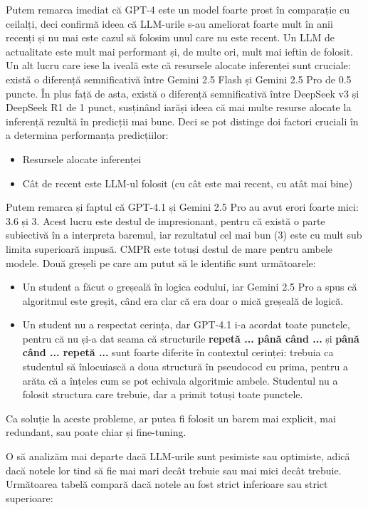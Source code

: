 \documentclass[12pt, a4paper]{report}
\begin{document}
Putem remarca imediat că GPT-4 este un model foarte prost în comparație cu ceilalți, deci confirmă ideea că LLM-urile s-au ameliorat foarte mult în anii recenți  
și nu mai este cazul să folosim unul care nu este recent. Un LLM de actualitate este mult mai performant și, de multe ori, mult mai ieftin de folosit.  
Un alt lucru care iese la iveală este că resursele alocate inferenței sunt cruciale: există o diferență semnificativă între Gemini 2.5 Flash și Gemini 2.5 Pro de 0.5 puncte.  
În plus față de asta, există o diferență semnificativă între DeepSeek v3 și DeepSeek R1 de 1 punct, susținând iarăși ideea că mai multe resurse alocate la inferență rezultă în predicții mai bune.  
Deci se pot distinge doi factori cruciali în a determina performanța predicțiilor:
\begin{itemize}
  \item Resursele alocate inferenței
  \item Cât de recent este LLM-ul folosit (cu cât este mai recent, cu atât mai bine)
\end{itemize}


Putem remarca și faptul că GPT-4.1 și Gemini 2.5 Pro au avut erori foarte mici: 3.6 și 3. Acest lucru este destul de impresionant, pentru că există o parte subiectivă  
în a interpreta baremul, iar rezultatul cel mai bun (3) este cu mult sub limita superioară impusă. CMPR este totuși destul de mare pentru ambele modele.  
Două greșeli pe care am putut să le identific sunt următoarele:
\begin{itemize}
  \item Un student a făcut o greșeală în logica codului, iar Gemini 2.5 Pro a spus că algoritmul este greșit, când era clar că era doar o mică greșeală de logică.
  \item Un student nu a respectat cerința, dar GPT-4.1 i-a acordat toate punctele, pentru că nu și-a dat seama că structurile \textbf{repetă ... până când ...} și \textbf{până când ... repetă ...}  
  sunt foarte diferite în contextul cerinței: trebuia ca studentul să înlocuiască a doua structură în pseudocod cu prima, pentru a arăta că a înțeles cum se pot echivala algoritmic ambele.  
  Studentul nu a folosit structura care trebuie, dar a primit totuși toate punctele.
\end{itemize}

Ca soluție la aceste probleme, ar putea fi folosit un barem mai explicit, mai redundant, sau poate chiar și fine-tuning.

O să analizăm mai departe dacă LLM-urile sunt pesimiste sau optimiste, adică dacă notele lor tind să fie mai mari decât trebuie sau mai mici decât trebuie.
Următoarea tabelă compară dacă notele au fost strict inferioare sau strict superioare:
\end{document}
